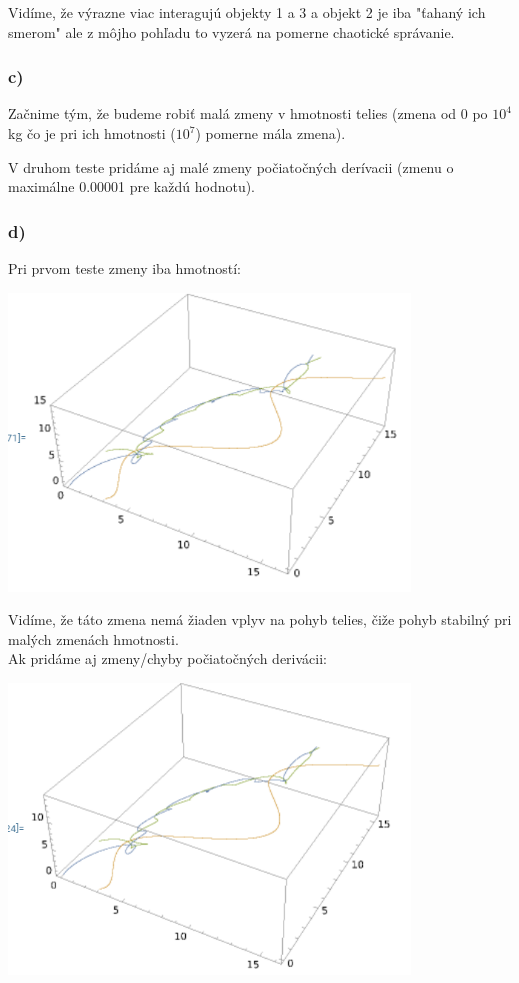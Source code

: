 \documentclass[a4paper]{article}
\begin{document}
	Vidíme, že výrazne viac interagujú objekty 1 a 3 a objekt 2 je iba "ťahaný ich smerom" ale z môjho pohľadu to vyzerá na pomerne chaotické správanie.
	
	\subsubsection{c)}
	
	Začnime tým, že budeme robiť malá zmeny v hmotnosti telies (zmena od 0 po $10^4$ kg čo je pri ich hmotnosti ($10^7$) pomerne mála zmena).
	
	V druhom teste pridáme aj malé zmeny počiatočných derívacii (zmenu o maximálne 0.00001 pre každú hodnotu).
	
	\subsubsection{d)}
	
	Pri prvom teste zmeny iba hmotností:
	
	\centerline{\includegraphics[width=0.8\textwidth]{pohyb_4}}
	
	Vidíme, že táto zmena nemá žiaden vplyv na pohyb telies, čiže pohyb stabilný pri malých zmenách hmotnosti. 
	\\
	
	Ak pridáme aj zmeny/chyby počiatočných derivácii:
	
	\centerline{\includegraphics[width=0.8\textwidth]{pohyb_5}}
	
\end{document}
